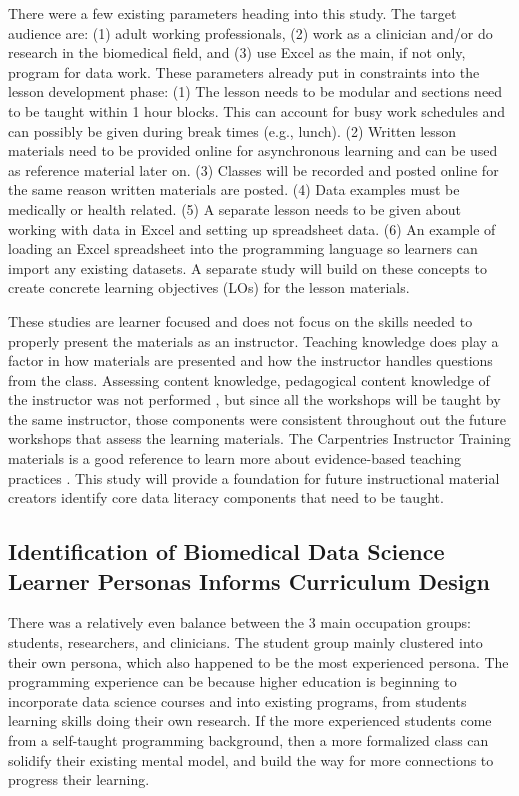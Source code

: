 \documentclass[020-persona\_validation.tex]{subfiles}
\begin{document}

    There were a few existing parameters heading into this study.
    The target audience are:
    (1) adult working professionals,
    (2) work as a clinician and/or do research in the biomedical field, and
    (3) use Excel as the main, if not only, program for data work.
    These parameters already put in constraints into the lesson development phase:
    (1) The lesson needs to be modular and sections need to be taught within 1 hour blocks.
    This can account for busy work schedules and can possibly be given during break times (e.g., lunch).
    (2) Written lesson materials need to be provided online for asynchronous learning and can be used as reference material later on.
    (3) Classes will be recorded and posted online for the same reason written materials are posted.
    (4) Data examples must be medically or health related.
    (5) A separate lesson needs to be given about working with data in Excel and setting up spreadsheet data.
    (6) An example of loading an Excel spreadsheet into the programming language so learners can import any existing datasets.
    A separate study will build on these concepts to create concrete learning objectives (LOs) for the lesson materials.

    These studies are learner focused and does not focus on the skills needed to properly present the materials as an instructor.
    Teaching knowledge does play a factor in how materials are presented and how the instructor handles questions from the class.
    Assessing content knowledge, pedagogical content knowledge of the instructor was not performed
    \cite{shulmanThoseWhoUnderstand1986},
    but since all the workshops will be taught by the same instructor, those components were consistent throughout out
    the future workshops that assess the learning materials.
    The Carpentries Instructor Training materials is a good reference to learn more about evidence-based teaching practices
    \cite{Koch2016}.
    This study will provide a foundation for future instructional material creators identify core data literacy components
    that need to be taught.

    \subsection{Identification of Biomedical Data Science Learner Personas Informs Curriculum Design}

        There was a relatively even balance between the 3 main occupation groups: students, researchers, and clinicians.
        The student group mainly clustered into their own persona,
        which also happened to be the most experienced persona.
        The programming experience can be because higher education is beginning to incorporate data science courses and
        into existing programs,
        from students learning skills doing their own research.
        If the more experienced students come from a self-taught programming background,
        then a more formalized class can solidify their existing mental model,
        and build the way for more connections to progress their learning.
\end{document}
